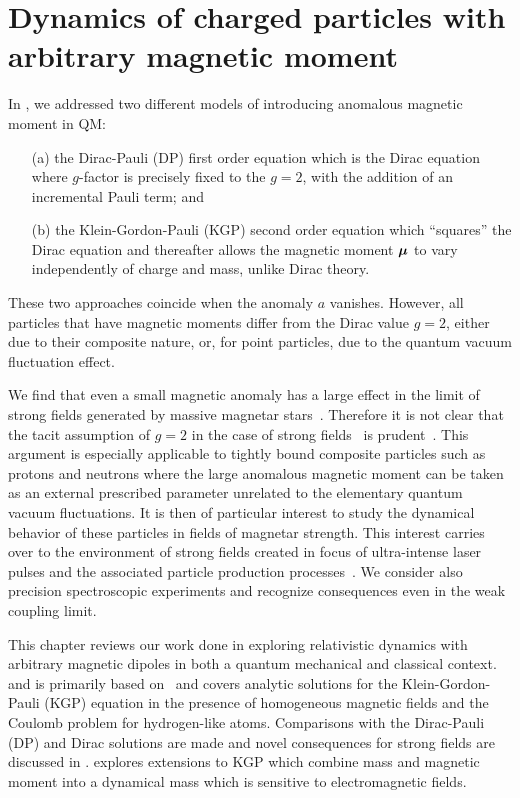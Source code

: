 \chapter{Dynamics of charged particles with arbitrary magnetic moment}
\label{chap:moment}
\noindent In , we addressed two different models of introducing anomalous magnetic moment in QM: 
\begin{enumerate}
\item[(a)] the Dirac-Pauli (DP) first order equation which is the Dirac equation where $g$-factor is precisely fixed to the $g\!=\!2$, with the addition of an incremental Pauli term; and
\item[(b)] the Klein-Gordon-Pauli (KGP) second order equation which ``squares'' the Dirac equation and thereafter allows the magnetic moment $\boldsymbol{\mu}$ to vary independently of charge and mass, unlike Dirac theory.
\end{enumerate} 
These two approaches coincide when the anomaly $a$ vanishes. However, all particles that have magnetic moments differ from the Dirac value $g\!=\!2$, either due to their composite nature, or, for point particles, due to the quantum vacuum fluctuation effect.

We find that even a small magnetic anomaly has a large effect in the limit of strong fields generated by massive magnetar stars~\citep{Kaspi:2017fwg}. Therefore it is not clear that the tacit assumption of $g\!=\!2$ in the case of strong fields~\citep{Rafelski:1976ts,Greiner:1985ce,Rafelski:2016ixr} is prudent~\citep{Evans:2018kor}. This argument is especially applicable to tightly bound composite particles such as protons and neutrons where the large anomalous magnetic moment can be taken as an external prescribed parameter unrelated to the elementary quantum vacuum fluctuations. It is then of particular interest to study the dynamical behavior of these particles in fields of magnetar strength. This interest carries over to the environment of strong fields created in focus of ultra-intense laser pulses and the associated particle production processes~\citep{Dunne:2014qda,Hegelich:2014tda}. We consider also precision spectroscopic experiments and recognize consequences even in the weak coupling limit.

This chapter reviews our work done in exploring relativistic dynamics with arbitrary magnetic dipoles in both a quantum mechanical and classical context.  and  is primarily based on~\cite{Steinmetz:2018ryf} and covers analytic solutions for the Klein-Gordon-Pauli (KGP) equation in the presence of homogeneous magnetic fields and the Coulomb problem for hydrogen-like atoms. Comparisons with the Dirac-Pauli (DP) and Dirac solutions are made and novel consequences for strong fields are discussed in .  explores extensions to KGP which combine mass and magnetic moment into a dynamical mass which is sensitive to electromagnetic fields.

